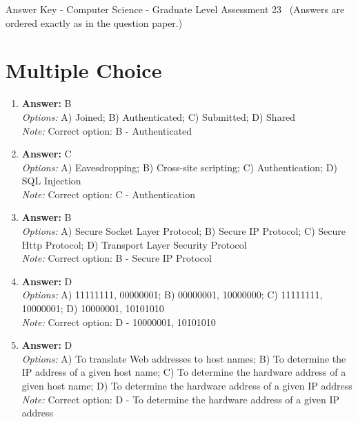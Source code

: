 \documentclass[12pt]{article}
\begin{document}
\begin{center}
Answer Key - Computer Science - Graduate Level Assessment 23 \
\small (Answers are ordered exactly as in the question paper.)
\end{center}

\section*{Multiple Choice}
\begin{enumerate}[label=\arabic*.]
\item \textbf{Answer:} B
\\ \textit{Options:} A) Joined; B) Authenticated; C) Submitted; D) Shared
\\ \textit{Note:} Correct option: B - Authenticated
\item \textbf{Answer:} C
\\ \textit{Options:} A) Eavesdropping; B) Cross-site scripting; C) Authentication; D) SQL Injection
\\ \textit{Note:} Correct option: C - Authentication
\item \textbf{Answer:} B
\\ \textit{Options:} A) Secure Socket Layer Protocol; B) Secure IP Protocol; C) Secure Http Protocol; D) Transport Layer Security Protocol
\\ \textit{Note:} Correct option: B - Secure IP Protocol
\item \textbf{Answer:} D
\\ \textit{Options:} A) 11111111, 00000001; B) 00000001, 10000000; C) 11111111, 10000001; D) 10000001, 10101010
\\ \textit{Note:} Correct option: D - 10000001, 10101010
\item \textbf{Answer:} D
\\ \textit{Options:} A) To translate Web addresses to host names; B) To determine the IP address of a given host name; C) To determine the hardware address of a given host name; D) To determine the hardware address of a given IP address
\\ \textit{Note:} Correct option: D - To determine the hardware address of a given IP address
\end{enumerate}
\end{document}
